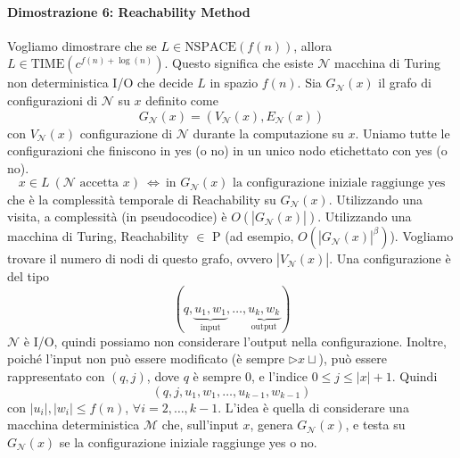 \paragraph{Dimostrazione 6: Reachability Method} Vogliamo dimostrare che se $L\in\text{NSPACE}(f(n))$, allora $L\in\text{TIME}(c^{f(n)+\log(n)})$. Questo significa che esiste $\mathcal{N}$ macchina di Turing non deterministica I/O che decide $L$ in spazio $f(n)$. Sia $G_\mathcal{N}(x)$ il grafo di configurazioni di $\mathcal{N}$ su $x$ definito come
$$
    G_\mathcal{N}(x) = (V_\mathcal{N}(x),E_\mathcal{N}(x))
$$
con $V_\mathcal{N}(x)$ configurazione di $\mathcal{N}$ durante la computazione su $x$. Uniamo tutte le configurazioni che finiscono in yes (o no) in un unico nodo etichettato con yes (o no). 
$$
    x\in L ~(\mathcal{N} \text{ accetta } x)
    ~\Leftrightarrow~
    \text{in } G_\mathcal{N}(x) \text{ la configurazione iniziale raggiunge yes}
$$
che è la complessità temporale di Reachability su $G_\mathcal{N}(x)$. Utilizzando una visita, a complessità (in pseudocodice) è $O(|G_\mathcal{N}(x)|)$. Utilizzando una macchina di Turing, Reachability $\in$ P (ad esempio, $O(|G_\mathcal{N}(x)|^\beta)$).
Vogliamo trovare il numero di nodi di questo grafo, ovvero $|V_\mathcal{N}(x)|$.  Una configurazione è del tipo 
$$
    (q,\underbrace{u_1,w_1}_{\text{input}},\dots,\underbrace{u_k,w_k}_{\text{output}})
$$
$\mathcal{N}$ è I/O, quindi possiamo non considerare l'output nella configurazione. Inoltre, poiché l'input non può essere modificato (è sempre $\rhd x\sqcup$), può essere rappresentato con $(q,j)$, dove $q$ è sempre 0, e l'indice $0\leq j\leq|x|+1$. Quindi 
$$
    (q,j,u_1,w_1,\dots,u_{k-1},w_{k-1})
$$
con $|u_i|,|w_i|\leq f(n)$, $\forall i=2,\dots,k-1$. L'idea è quella di considerare una macchina deterministica $\mathcal{M}$ che, sull'input $x$, genera $G_\mathcal{N}(x)$, e testa su $G_\mathcal{N}(x)$ se la configurazione iniziale raggiunge yes o no.
